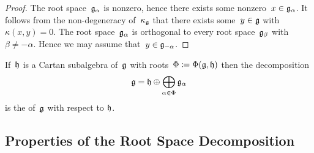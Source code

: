 \begin{proof}
  The root space~$\mathfrak{g}_\alpha$ is nonzero, hence there exists some nonzero~$x \in \mathfrak{g}_\alpha$.
  It follows from the non-degeneracy of~$\kappa_{\mathfrak{g}}$ that there exists some~$y \in \mathfrak{g}$ with~$\kappa(x,y) = 0$.
  The root space~$\mathfrak{g}_\alpha$ is orthogonal to every root space~$\mathfrak{g}_\beta$ with~$\beta \neq -\alpha$.
  Hence we may assume that~$y \in \mathfrak{g}_{-\alpha}$.
\end{proof}


\begin{definition}
  If~$\mathfrak{h}$ is a Cartan subalgebra of~$\mathfrak{g}$ with roots~$\Phi \coloneqq \Phi(\mathfrak{g}, \mathfrak{h})$ then the decomposition
  \[
    \mathfrak{g}
    = 
    \mathfrak{h} \oplus \bigoplus_{\alpha \in \Phi} \mathfrak{g}_\alpha
  \]
  is the  of~$\mathfrak{g}$ with respect to $\mathfrak{h}$.
\end{definition}





\subsection{Properties of the Root Space Decomposition}


